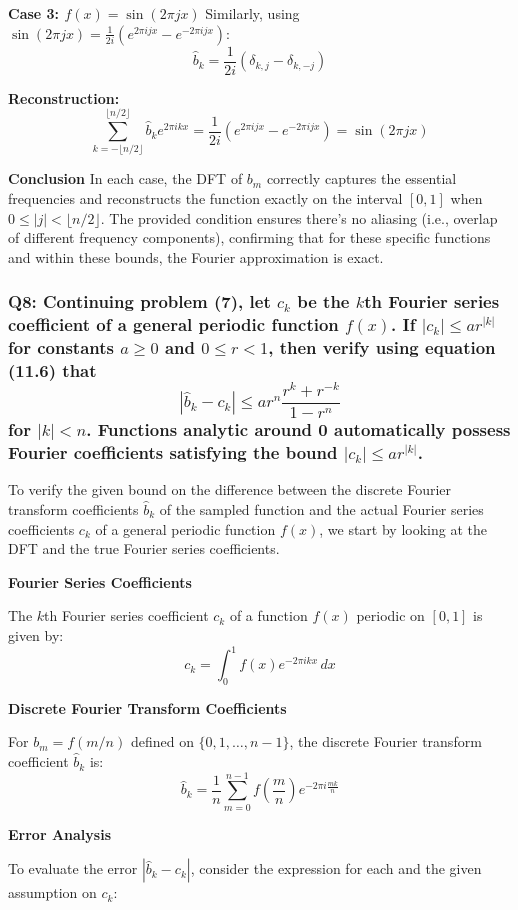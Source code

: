 \documentclass[8pt]{article}
\begin{document}
\textbf{Case 3: \(f(x) = \sin(2\pi jx)\)}
Similarly, using \(\sin(2\pi jx) = \frac{1}{2i} (e^{2\pi ijx} - e^{-2\pi ijx})\):
\[
\hat{b}_k = \frac{1}{2i}(\delta_{k, j} - \delta_{k, -j})
\]

\textbf{Reconstruction:}
\[
\sum_{k=-\lfloor n/2 \rfloor}^{\lfloor n/2 \rfloor} \hat{b}_k e^{2\pi ikx} = \frac{1}{2i} (e^{2\pi ijx} - e^{-2\pi ijx}) = \sin(2\pi jx)
\]

\textbf{Conclusion}
In each case, the DFT of \(b_m\) correctly captures the essential frequencies and reconstructs the function exactly on the interval \([0,1]\) when \(0 \leq |j| < \lfloor n/2 \rfloor\). The provided condition ensures there's no aliasing (i.e., overlap of different frequency components), confirming that for these specific functions and within these bounds, the Fourier approximation is exact.

\subsubsection*{Q8:
Continuing problem (7), let \(c_k\) be the \(k\)th Fourier series coefficient of a general periodic function \(f(x)\). If \(|c_k| \leq ar^{|k|}\) for constants \(a \geq 0\) and \(0 \leq r < 1\), then verify using equation (11.6) that
\[
|\hat{b}_k - c_k| \leq ar^n \frac{r^k + r^{-k}}{1 - r^n}
\]
for \(|k| < n\). Functions analytic around 0 automatically possess Fourier coefficients satisfying the bound \(|c_k| \leq ar^{|k|}\).}

To verify the given bound on the difference between the discrete Fourier transform coefficients \( \hat{b}_k \) of the sampled function and the actual Fourier series coefficients \( c_k \) of a general periodic function \( f(x) \), we start by looking at the DFT and the true Fourier series coefficients. 

\textbf{Fourier Series Coefficients}

The \(k\)th Fourier series coefficient \(c_k\) of a function \(f(x)\) periodic on \([0, 1]\) is given by:
\[
c_k = \int_0^1 f(x) e^{-2\pi i k x} \, dx
\]

\textbf{Discrete Fourier Transform Coefficients}

For \(b_m = f(m/n)\) defined on \(\{0, 1, \ldots, n-1\}\), the discrete Fourier transform coefficient \( \hat{b}_k \) is:
\[
\hat{b}_k = \frac{1}{n} \sum_{m=0}^{n-1} f\left(\frac{m}{n}\right) e^{-2\pi i \frac{mk}{n}}
\]

\textbf{Error Analysis}

To evaluate the error \( |\hat{b}_k - c_k| \), consider the expression for each and the given assumption on \(c_k\):
\end{document}
